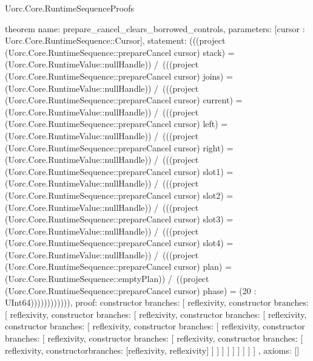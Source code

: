 \begin{lexlean}{Uorc.Core.RuntimeSequenceProofs}
\begin{semanticmodule}
theorem{
  name: prepare_cancel_clears_borrowed_controls,
  parameters: [cursor : Uorc.Core.RuntimeSequence::Cursor],
  statement: (((project (Uorc.Core.RuntimeSequence::prepareCancel cursor) stack) = (Uorc.Core.RuntimeValue::nullHandle)) /\ (((project (Uorc.Core.RuntimeSequence::prepareCancel cursor) joins) = (Uorc.Core.RuntimeValue::nullHandle)) /\ (((project (Uorc.Core.RuntimeSequence::prepareCancel cursor) current) = (Uorc.Core.RuntimeValue::nullHandle)) /\ (((project (Uorc.Core.RuntimeSequence::prepareCancel cursor) left) = (Uorc.Core.RuntimeValue::nullHandle)) /\ (((project (Uorc.Core.RuntimeSequence::prepareCancel cursor) right) = (Uorc.Core.RuntimeValue::nullHandle)) /\ (((project (Uorc.Core.RuntimeSequence::prepareCancel cursor) slot1) = (Uorc.Core.RuntimeValue::nullHandle)) /\ (((project (Uorc.Core.RuntimeSequence::prepareCancel cursor) slot2) = (Uorc.Core.RuntimeValue::nullHandle)) /\ (((project (Uorc.Core.RuntimeSequence::prepareCancel cursor) slot3) = (Uorc.Core.RuntimeValue::nullHandle)) /\ (((project (Uorc.Core.RuntimeSequence::prepareCancel cursor) slot4) = (Uorc.Core.RuntimeValue::nullHandle)) /\ (((project (Uorc.Core.RuntimeSequence::prepareCancel cursor) plan) = (Uorc.Core.RuntimeSequence::emptyPlan)) /\ ((project (Uorc.Core.RuntimeSequence::prepareCancel cursor) phase) = (20 : UInt64)))))))))))),
  proof: constructor{
    branches: [
      reflexivity{},
      constructor{
        branches: [
          reflexivity{},
          constructor{
            branches: [
              reflexivity{},
              constructor{
                branches: [
                  reflexivity{},
                  constructor{
                    branches: [
                      reflexivity{},
                      constructor{
                        branches: [
                          reflexivity{},
                          constructor{
                            branches: [
                              reflexivity{},
                              constructor{
                                branches: [
                                  reflexivity{},
                                  constructor{
                                    branches: [
                                      reflexivity{},
                                      constructor{branches: [reflexivity{}, reflexivity{}]}
                                    ]
                                  }
                                ]
                              }
                            ]
                          }
                        ]
                      }
                    ]
                  }
                ]
              }
            ]
          }
        ]
      }
    ]
  },
  axioms: []
}


\end{semanticmodule}
\end{lexlean}
